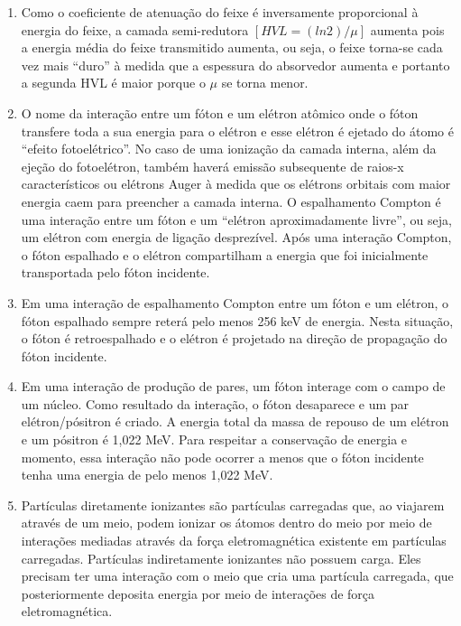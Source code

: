 \documentclass[11pt,a4paper]{article}
\begin{document}
\begin{enumerate}
        \item Como o coeficiente de atenuação do feixe é inversamente proporcional à energia do feixe, a camada semi-redutora  $[HVL = (ln 2) / \mu]$ aumenta pois a energia média do feixe transmitido aumenta, ou seja, o feixe torna-se cada vez mais “duro” à medida que a espessura do absorvedor aumenta e portanto a segunda HVL é maior porque o $\mu$ se torna menor.
        
        \item O nome da interação entre um fóton e um elétron atômico onde o fóton transfere toda a sua energia para o elétron e esse elétron é ejetado do átomo é ``efeito fotoelétrico''. No caso de uma ionização da camada interna, além da ejeção do fotoelétron, também haverá emissão subsequente de raios-x característicos ou elétrons Auger à medida que os elétrons orbitais com  maior energia caem para preencher a camada interna. O espalhamento Compton é uma interação entre um fóton e um “elétron aproximadamente livre”, ou seja, um elétron com energia de ligação desprezível. Após uma interação Compton, o fóton espalhado e o elétron compartilham a energia que foi inicialmente transportada pelo fóton incidente.
        
        \item Em uma interação de espalhamento Compton entre um fóton e um elétron, o fóton espalhado sempre reterá pelo menos 256 keV de energia. Nesta situação, o fóton é retroespalhado e o elétron é projetado na direção de propagação do fóton incidente.
        
        \item Em uma interação de produção de pares, um fóton interage com o campo de um núcleo. Como resultado da interação, o fóton desaparece e um par elétron/pósitron é criado. A energia total da massa de repouso de um elétron e um pósitron é 1,022 MeV. Para respeitar a conservação de energia e momento, essa interação não pode ocorrer a menos que o fóton incidente tenha uma energia de pelo menos 1,022 MeV.
        
        \item Partículas diretamente ionizantes são partículas carregadas que, ao viajarem através de um meio, podem ionizar os átomos dentro do meio por meio de interações mediadas através da força eletromagnética existente em partículas carregadas. Partículas indiretamente ionizantes não possuem carga. Eles precisam ter uma interação com o meio que cria uma partícula carregada, que posteriormente deposita energia por meio de interações de força eletromagnética.
        

\end{enumerate}
\end{document}
